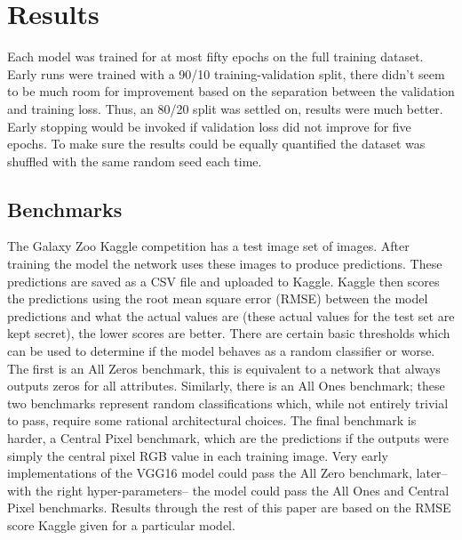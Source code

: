 \section{Results}



Each model was trained for at most fifty epochs on the full training dataset. Early runs were trained with a 90/10 training-validation split, there didn't seem to be much room for improvement based on the separation between the validation and training loss. Thus, an 80/20 split was settled on, results were much better. Early stopping would be invoked if validation loss did not improve for five epochs. To make sure the results could be equally quantified the dataset was shuffled with the same random seed each time.

\subsection{Benchmarks}\label{benchmarks}
The Galaxy Zoo Kaggle competition has a test image set of  images. After training the model the network uses these images to produce predictions. These predictions are saved as a CSV file and uploaded to Kaggle. Kaggle then scores the predictions using the root mean square error (RMSE) between the model predictions and what the actual values are (these actual values for the test set are kept secret), the lower scores are better. There are certain basic thresholds which can be used to determine if the model behaves as a random classifier or worse. The first is an All Zeros benchmark, this is equivalent to a network that always outputs zeros for all attributes. Similarly, there is an All Ones benchmark; these two benchmarks represent random classifications which, while not entirely trivial to pass, require some rational architectural choices. The final benchmark is harder, a Central Pixel benchmark, which are the predictions if the outputs were simply the central pixel RGB value in each training image. Very early implementations of the VGG16 model could pass the All Zero benchmark, later--with the right hyper-parameters-- the model could pass the All Ones and Central Pixel benchmarks. Results through the rest of this paper are based on the RMSE score Kaggle given for a particular model.

